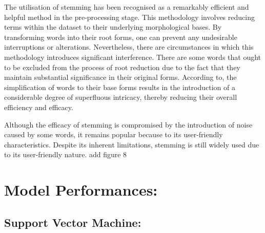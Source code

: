 The utilisation of stemming has been recognised as a remarkably efficient and helpful method in the pre-processing stage. This methodology involves reducing terms within the dataset to their underlying morphological bases. By transforming words into their root forms, one can prevent any undesirable interruptions or alterations. Nevertheless, there are circumstances in which this methodology introduces significant interference. There are some words that ought to be excluded from the process of root reduction due to the fact that they maintain substantial significance in their original forms. According to\cite{hickman2022}, the simplification of words to their base forms results in the introduction of a considerable degree of superfluous intricacy, thereby reducing their overall efficiency and efficacy.

Although the efficacy of stemming is compromised by the introduction of noise caused by some words, it remains popular because to its user-friendly characteristics. Despite its inherent limitations, stemming is still widely used due to its user-friendly nature.
add figure 8




\section{Model Performances:}
\subsection{Support Vector Machine:}


